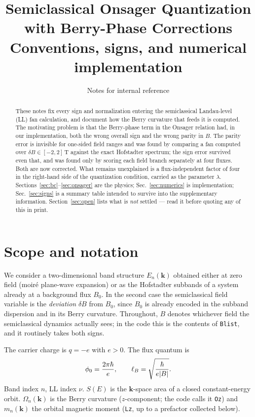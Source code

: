 \documentclass[11pt]{article}
\title{Semiclassical Onsager Quantization with Berry-Phase Corrections\\
\large Conventions, signs, and numerical implementation}
\author{Notes for internal reference}
\date{}
\newcommand{\kb}{\mathbf{k}}
\newcommand{\Om}{\Omega}
\newcommand{\Bfield}{B}
\newcommand{\lB}{\ell_B}
\newcommand{\code}[1]{\texttt{#1}}
\begin{document}
\maketitle

\begin{abstract}
\noindent
These notes fix every sign and normalization entering the semiclassical
Landau-level (LL) fan calculation, and document how the Berry curvature
that feeds it is computed.  The motivating problem is that the
Berry-phase term in the Onsager relation had, in our implementation,
both the wrong overall sign and the wrong parity in $\Bfield$.  The
parity error is invisible for one-sided field ranges and was found by
comparing a fan computed over $\delta\Bfield \in [-2,2]\,$T against the
exact Hofstadter spectrum; the sign error survived even that, and was
found only by scoring each field branch separately at four fluxes.  Both
are now corrected.  What remains unexplained is a flux-independent
factor of four in the right-hand side of the quantization condition,
carried as the parameter $\lambda$.
Sections~\ref{sec:bc}--\ref{sec:onsager}
are the physics; Sec.~\ref{sec:numerics} is implementation;
Sec.~\ref{sec:signs} is a summary table intended to survive into the
supplementary information.  Section~\ref{sec:open} lists what is
\emph{not} settled --- read it before quoting any of this in print.
\end{abstract}

\tableofcontents

\section{Scope and notation}

We consider a two-dimensional band structure $E_n(\kb)$ obtained either
at zero field (moir\'e plane-wave expansion) or as the Hofstadter
subbands of a system already at a background flux
$\Bfield_0$.  In the second case the semiclassical field variable is the
\emph{deviation} $\delta\Bfield$ from $\Bfield_0$, since $\Bfield_0$ is
already encoded in the subband dispersion and in its Berry curvature.
Throughout, $\Bfield$ denotes whichever field the semiclassical dynamics
actually sees; in the code this is the contents of \code{Blist}, and it
routinely takes both signs.

The carrier charge is $q = -e$ with $e>0$.  The flux quantum is
\begin{equation}
  \phi_0 = \frac{2\pi\hbar}{e},
  \qquad
  \lB = \sqrt{\frac{\hbar}{e\abs{\Bfield}}}.
\end{equation}
Band index $n$, LL index $\nu$.  $S(E)$ is the $\kb$-space area of a
closed constant-energy orbit.  $\Om_n(\kb)$ is the Berry curvature
($z$-component; the code calls it \code{Oz}) and $m_n(\kb)$ the orbital
magnetic moment (\code{Lz}, up to a prefactor collected below).
\end{document}
